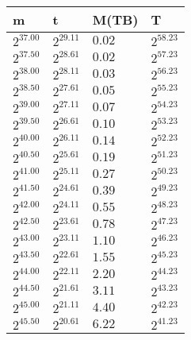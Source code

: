 \begin{tabular}{llll}
m & t & M(TB) & T \\ \hline
$2^{37.00}$ & $2^{29.11}$ & $0.02$ & $2^{58.23}$ \\
$2^{37.50}$ & $2^{28.61}$ & $0.02$ & $2^{57.23}$ \\
$2^{38.00}$ & $2^{28.11}$ & $0.03$ & $2^{56.23}$ \\
$2^{38.50}$ & $2^{27.61}$ & $0.05$ & $2^{55.23}$ \\
$2^{39.00}$ & $2^{27.11}$ & $0.07$ & $2^{54.23}$ \\
$2^{39.50}$ & $2^{26.61}$ & $0.10$ & $2^{53.23}$ \\
$2^{40.00}$ & $2^{26.11}$ & $0.14$ & $2^{52.23}$ \\
$2^{40.50}$ & $2^{25.61}$ & $0.19$ & $2^{51.23}$ \\
$2^{41.00}$ & $2^{25.11}$ & $0.27$ & $2^{50.23}$ \\
$2^{41.50}$ & $2^{24.61}$ & $0.39$ & $2^{49.23}$ \\
$2^{42.00}$ & $2^{24.11}$ & $0.55$ & $2^{48.23}$ \\
$2^{42.50}$ & $2^{23.61}$ & $0.78$ & $2^{47.23}$ \\
$2^{43.00}$ & $2^{23.11}$ & $1.10$ & $2^{46.23}$ \\
$2^{43.50}$ & $2^{22.61}$ & $1.55$ & $2^{45.23}$ \\
$2^{44.00}$ & $2^{22.11}$ & $2.20$ & $2^{44.23}$ \\
$2^{44.50}$ & $2^{21.61}$ & $3.11$ & $2^{43.23}$ \\
$2^{45.00}$ & $2^{21.11}$ & $4.40$ & $2^{42.23}$ \\
$2^{45.50}$ & $2^{20.61}$ & $6.22$ & $2^{41.23}$ \\
\end{tabular}
\\\\
\\\\
